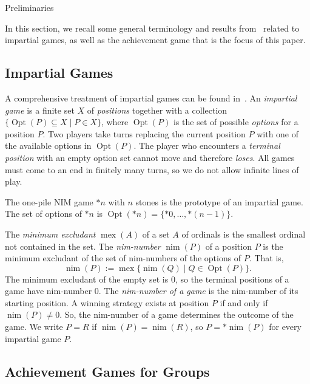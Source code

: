 \documentclass[12pt]{amsart}
\theoremstyle{definition}
\theoremstyle{definition}
\numberwithin{equation}{section}
\begin{document}
\begin{section}{Preliminaries}

In this section, we recall some general terminology and results from~\cite{BeneshErnstSiebenSymAlt,BeneshErnstSiebenDNG, ErnstSieben} related to impartial games, as well as the achievement game that is the focus of this paper.

\subsection{Impartial Games}

A comprehensive treatment of impartial games can be
found in~\cite{albert2007lessons,SiegelBook}. An \emph{impartial
game} is a finite set $X$ of \emph{positions} together with a collection $\{{\operatorname{Opt}}(P)\subseteq X\mid P\in X\}$, where ${\operatorname{Opt}}(P)$ is the set of
possible \emph{options} for a position $P$. Two players take turns replacing the current position $P$ with one of the available options in ${\operatorname{Opt}}(P)$. 
The player who encounters a \emph{terminal position} with
an empty option set cannot move and therefore \emph{loses}. All games
must come to an end in finitely many turns, so we do not allow infinite
lines of play. 

The one-pile NIM game $*n$ with $n$ stones is the prototype of an impartial game. 
The set of options of $*n$ is ${\operatorname{Opt}}(*n)=\{*0,\ldots,*(n-1)\}$.

The \emph{minimum excludant} ${\operatorname{mex}}(A)$ of a set $A$ of ordinals
is the smallest ordinal not contained in the set. The \emph{nim-number}
${\operatorname{nim}}(P)$ of a position $P$ is the minimum excludant of the set
of nim-numbers of the options of $P$. That is, 
\[
{\operatorname{nim}}(P):={\operatorname{mex}}\{{\operatorname{nim}}(Q)\mid Q\in{\operatorname{Opt}}(P)\}.
\]
The minimum excludant of the empty set is $0$, so the terminal positions
of a game have nim-number $0$. 
The \emph{nim-number of a game} is the nim-number of its starting position. 
A winning strategy exists at position $P$ if and only if ${\operatorname{nim}}(P)\ne 0$.
So, the nim-number of a game determines the outcome of the game. 
We write $P=R$ if ${\operatorname{nim}}(P)={\operatorname{nim}}(R)$, so $P=*{\operatorname{nim}}(P)$ for every impartial game $P$.

\subsection{Achievement Games for Groups}


\end{section}
\end{document}

